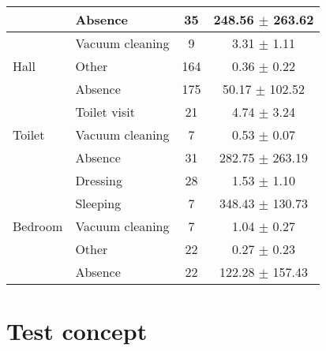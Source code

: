 \begin{table}[htbp]
\begin{tabular}{l|l|c|c}
        \cline{2-4}
        & Absence & 35 & 248.56 $\pm$ 263.62 \\
        \midrule[1pt]
        \multirow{3}{*}{Hall} & Vacuum cleaning & 9 & 3.31 $\pm$ 1.11 \\
        \cline{2-4}
        & Other & 164 & 0.36 $\pm$ 0.22 \\
        \cline{2-4}
        & Absence & 175 & 50.17 $\pm$ 102.52 \\
        \midrule[1pt]
        \multirow{3}{*}{Toilet} & Toilet visit & 21 & 4.74 $\pm$ 3.24 \\
        \cline{2-4}
        & Vacuum cleaning & 7 & 0.53 $\pm$ 0.07 \\
        \cline{2-4}
        & Absence & 31 & 282.75 $\pm$ 263.19 \\
        \midrule[1pt]
        \multirow{5}{*}{Bedroom} & Dressing & 28 & 1.53 $\pm$ 1.10 \\
        \cline{2-4}
        & Sleeping & 7 & 348.43 $\pm$ 130.73 \\
        \cline{2-4}
        & Vacuum cleaning & 7 & 1.04 $\pm$ 0.27 \\
        \cline{2-4}
        & Other & 22 & 0.27 $\pm$ 0.23 \\
        \cline{2-4}
        & Absence & 22 & 122.28 $\pm$ 157.43 \\
        \bottomrule
    \end{tabular}
\end{table}

\chapter{Test concept}
\label{app:Test-Concept}

\clearpage
\landscapevalues

